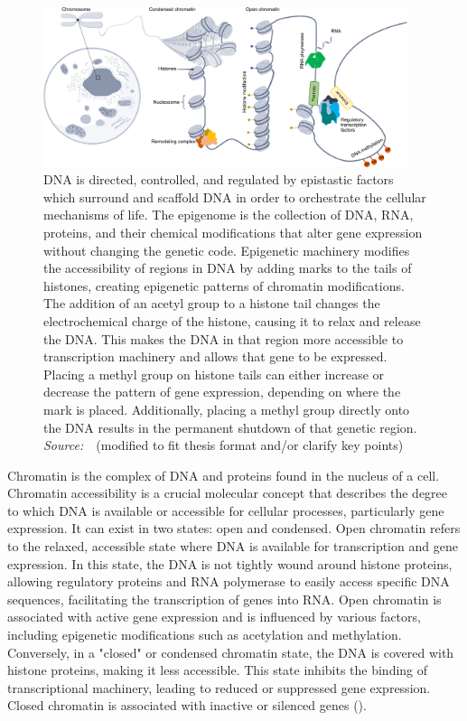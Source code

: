 \begin{figure}[!ht]
	\centering
	\includegraphics[width=0.95\textwidth]{chromatin_organization/fig}
	\vspace{0.1cm}
	\caption[DNA organization] {DNA is directed, controlled, and regulated by epistastic factors which surround and scaffold DNA in order to orchestrate the cellular mechanisms of life. The epigenome is the collection of DNA, RNA, proteins, and their chemical modifications that alter gene expression without changing the genetic code. Epigenetic machinery modifies the accessibility of regions in DNA by adding marks to the tails of histones, creating epigenetic patterns of chromatin modifications. The addition of an acetyl group to a histone tail changes the electrochemical charge of the histone, causing it to relax and release the DNA. This makes the DNA in that region more accessible to transcription machinery and allows that gene to be expressed. Placing a methyl group on histone tails can either increase or decrease the pattern of gene expression, depending on where the mark is placed. Additionally, placing a methyl group directly onto the DNA results in the permanent shutdown of that genetic region. \emph{Source:~\cite{heumos2023best}}~(modified to fit thesis format and/or clarify key points)}
	\label{fig:chromatin_organization}
\end{figure}


Chromatin is the complex of DNA and proteins found in the nucleus of a cell. Chromatin accessibility is a crucial molecular concept that describes the degree to which DNA is available or accessible for cellular processes, particularly gene expression. It can exist in two states: open and condensed. Open chromatin refers to the relaxed, accessible state where DNA is available for transcription and gene expression. In this state, the DNA is not tightly wound around histone proteins, allowing regulatory proteins and RNA polymerase to easily access specific DNA sequences, facilitating the transcription of genes into RNA. Open chromatin is associated with active gene expression and is influenced by various factors, including epigenetic modifications such as acetylation and methylation. Conversely, in a "closed" or condensed chromatin state, the DNA is covered with histone proteins, making it less accessible. This state inhibits the binding of transcriptional machinery, leading to reduced or suppressed gene expression. Closed chromatin is associated with inactive or silenced genes ().




